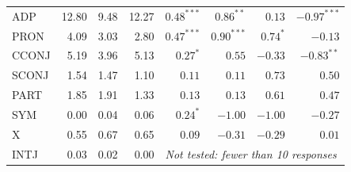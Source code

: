 \begin{table}[tbp]
\begin{tabular}{lrrrrrrr}
ADP & 12.80 & 9.48 & 12.27 & $0.48^{***}$ & $0.86^{**}$ & $0.13$ & $-0.97^{***}$ \\
PRON & 4.09 & 3.03 & 2.80 & $0.47^{***}$ & $0.90^{***}$ & $0.74^{*}$ & $-0.13$ \\
CCONJ & 5.19 & 3.96 & 5.13 & $0.27^{*}$ & $0.55$ & $-0.33$ & $-0.83^{**}$ \\
SCONJ & 1.54 & 1.47 & 1.10 & $0.11$ & $0.11$ & $0.73$ & $0.50$ \\
PART & 1.85 & 1.91 & 1.33 & $0.13$ & $0.13$ & $0.61$ & $0.47$ \\
SYM & 0.00 & 0.04 & 0.06 & $0.24^{*}$ & $-1.00$ & $-1.00$ & $-0.27$ \\
X & 0.55 & 0.67 & 0.65 & $0.09$ & $-0.31$ & $-0.29$ & $0.01$ \\
INTJ & 0.03 & 0.02 & 0.00 & \multicolumn{4}{l}{\emph{Not tested: fewer than 10 responses}} \\
\bottomrule
\end{tabular}
\end{table}
